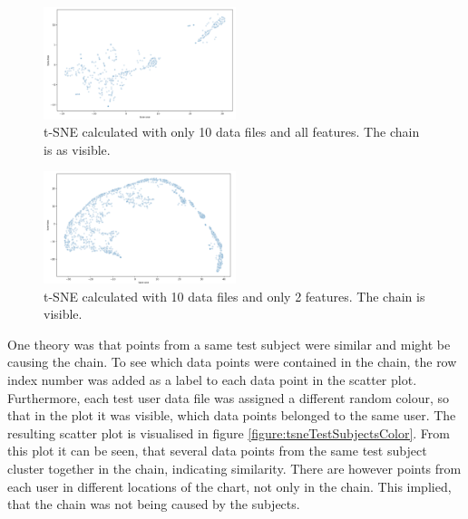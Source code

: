 \begin{figure}[h]
  \centering
  \includegraphics[width=0.5\textwidth]{./images/tsne10Files.png}
  \caption{t-SNE calculated with only 10 data files and all features. The chain is as visible.}
  \label{figure:tsne10Files}
\end{figure}

\begin{figure}[h]
  \centering
  \includegraphics[width=0.5\textwidth]{./images/tsne10Files2Features.png}
  \caption{t-SNE calculated with 10 data files and only 2 features. The chain is visible.}
  \label{figure:tsne10Files2Features}
\end{figure}

One theory was that points from a same test subject were similar and might be causing the chain. To see which data points were contained in the chain, the row index number was added as a label to each data point in the scatter plot. Furthermore, each test user data file was assigned a different random colour, so that in the plot it was visible, which data points belonged to the same user. The resulting scatter plot is visualised in figure \ref{figure:tsneTestSubjectsColor}. From this plot it can be seen, that several data points from the same test subject cluster together in the chain, indicating similarity. There are however points from each user in different locations of the chart, not only in the chain. This implied, that the chain was not being caused by the subjects. 

